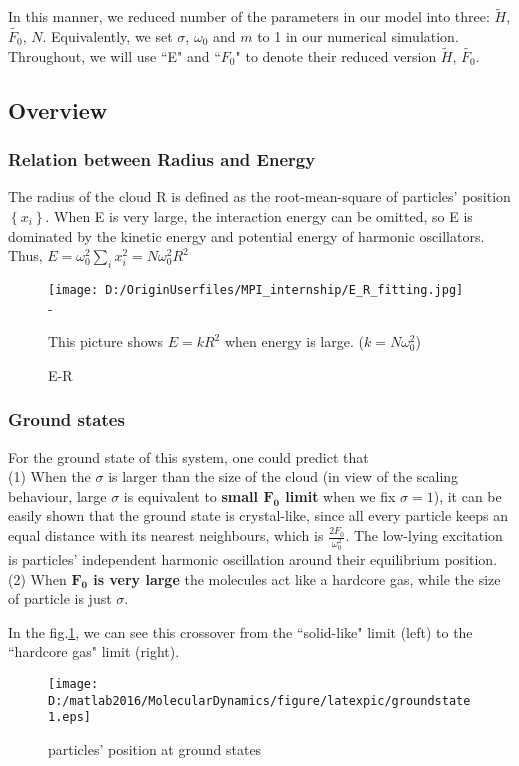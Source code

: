 \documentclass[aps,pre,twocolumn
,groupedaddress]{revtex4-1}
\begin{document}
In this manner, we reduced number of the parameters in our model into three: $\tilde{H}$, $\tilde{F_0}$, $N$. Equivalently, we set $\sigma$, $\omega_0$ and $m$ to 1 in our numerical simulation. Throughout, we will use ``E" and ``$F_0$" to denote their reduced version  $\tilde{H}$, $\tilde{F_0}$.

\subsection{Overview}
\subsubsection{Relation between Radius and Energy}
The radius of the cloud R is defined as the root-mean-square of particles' position $\left\lbrace x_i\right\rbrace$. When E is very large, the interaction energy can be omitted, so E is dominated by the kinetic energy and potential energy of harmonic oscillators. Thus, $E=\omega_0^2\sum_{i}x_i^2=N\omega_0^2R^2$ 
\begin{figure}
\centering
\texttt{[image: D:/OriginUserfiles/MPI\_internship/E\_R\_fitting.jpg]}
-\caption{E-R} This picture shows $E=kR^2$ when energy is large. ($k=N\omega_0^2$)
\end{figure}

\subsubsection{Ground states}
For the ground state of this system, one could predict that \\(1) When the $\sigma$ is larger than the size of the cloud (in view of the scaling behaviour, large $\sigma$ is equivalent to \textbf{small $\mathbf{F_0}$ limit} when we fix $\sigma=1$), it can be easily shown that the ground state is crystal-like, since all every particle keeps an equal distance with its nearest neighbours, which is $\frac{2F_0}{\omega_0^2}$. The low-lying excitation is particles' independent harmonic oscillation around their equilibrium position.\\(2) When \textbf{$\mathbf{F_0}$ is very large} the molecules act like a hardcore gas, while the size of particle is just $\sigma$.

In the fig.\ref{fig:GS1}, we can see this crossover from the ``solid-like" limit (left) to the ``hardcore gas" limit (right).

\begin{figure}[hbtp]
\centering
\texttt{[image: D:/matlab2016/MolecularDynamics/figure/latexpic/groundstate1.eps]}
\caption{particles' position at ground states }
\label{fig:GS1}
\end{figure}
\end{document}
